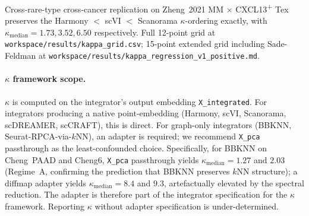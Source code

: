 Cross-rare-type cross-cancer replication on Zheng~2021 MM $\times$ CXCL13\textsuperscript{+} Tex preserves the Harmony $<$ scVI $<$ Scanorama $\kappa$-ordering exactly, with $\kappa_{\text{median}} = 1.73, 3.52, 6.50$ respectively. Full 12-point grid at \texttt{workspace/results/kappa\_grid.csv}; 15-point extended grid including Sade-Feldman at \texttt{workspace/results/kappa\_regression\_v1\_positive.md}.

\paragraph{$\kappa$ framework scope.} $\kappa$ is computed on the integrator's output embedding \texttt{X\_integrated}. For integrators producing a native point-embedding (Harmony, scVI, Scanorama, scDREAMER, scCRAFT), this is direct. For graph-only integrators (BBKNN, Seurat-RPCA-via-$k$NN), an adapter is required; we recommend \texttt{X\_pca} passthrough as the least-confounded choice. Specifically, for BBKNN on Cheng~PAAD and Cheng6, \texttt{X\_pca} passthrough yields $\kappa_{\text{median}} = 1.27$ and $2.03$ (Regime~A, confirming the prediction that BBKNN preserves $k$NN structure); a diffmap adapter yields $\kappa_{\text{median}} = 8.4$ and $9.3$, artefactually elevated by the spectral reduction. The adapter is therefore part of the integrator specification for the $\kappa$ framework. Reporting $\kappa$ without adapter specification is under-determined.

